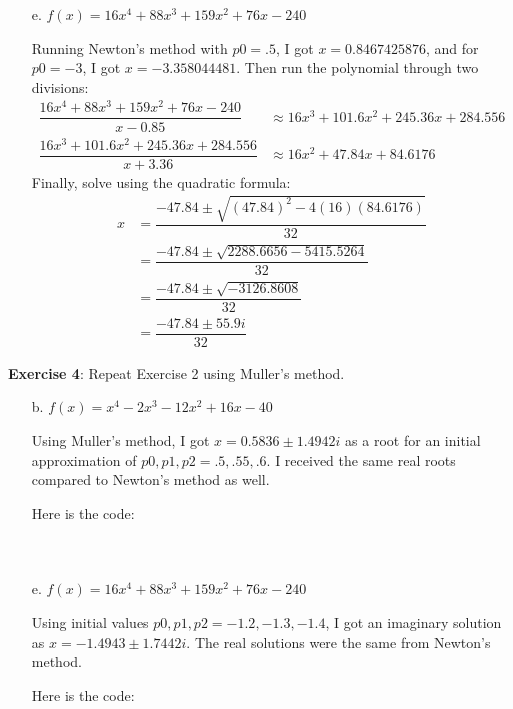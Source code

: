 \documentclass{article}
\begin{document}
\begin{itemize}
        \item [e.] $f(x) = 16x^{4} + 88x^{3} + 159x^{2} + 76x - 240$ 
            \begin{answer}
                Running Newton's method with $p0 = .5$, I got $x = 0.8467425876$, and for $p0 = -3$, I got $x = -3.358044481$. Then run the polynomial through two divisions:
                    \begin{align*}
                        \dfrac{16x^{4} + 88x^{3} + 159x^{2} + 76x - 240}{x - 0.85} &\approx 16x^{3} + 101.6x^{2} + 245.36x + 284.556 \\
                        \dfrac{16x^{3} + 101.6x^{2} + 245.36x + 284.556}{x + 3.36} &\approx 16x^{2} + 47.84x + 84.6176                 
                    \end{align*}
                Finally, solve using the quadratic formula:
                    \begin{align*}
                        x &= \dfrac{-47.84 \pm \sqrt{(47.84)^{2} - 4(16)(84.6176)}}{32} \\
                          &= \dfrac{-47.84 \pm \sqrt{2288.6656 - 5415.5264}}{32}        \\
                          &= \dfrac{-47.84 \pm \sqrt{-3126.8608}}{32}                   \\
                          &= \dfrac{-47.84 \pm 55.9i}{32}                                 
                    \end{align*}
            \end{answer}
    \end{itemize}

\textbf{Exercise 4}: Repeat Exercise 2 using Muller's method.
    \begin{itemize}
        \item [b.] $f(x) = x^{4} - 2x^{3} - 12x^{2} + 16x - 40$
            \begin{answer}
                Using Muller's method, I got $x = 0.5836 \pm 1.4942i$ as a root for an initial approximation of $p0, p1, p2 = .5, .55, .6$. I received the same real roots compared to Newton's method as well.

                Here is the code:
                \inputminted{matlab}{code/muller/muller.m}
                \inputminted{matlab}{code/myfunc6.m}
                \inputminted{matlab}{code/script6.m}
            \end{answer}

        \item [e.] $f(x) = 16x^{4} + 88x^{3} + 159x^{2} + 76x - 240$ 
            \begin{answer}
                Using initial values $p0, p1, p2 = -1.2, -1.3, -1.4$, I got an imaginary solution as $x = -1.4943 \pm 1.7442i$. The real solutions were the same from Newton's method.

                Here is the code:
                \inputminted{matlab}{code/muller/muller.m}
                \inputminted{matlab}{code/myfunc7.m}
                \inputminted{matlab}{code/script7.m}
            \end{answer}
    \end{itemize}
\end{document}
